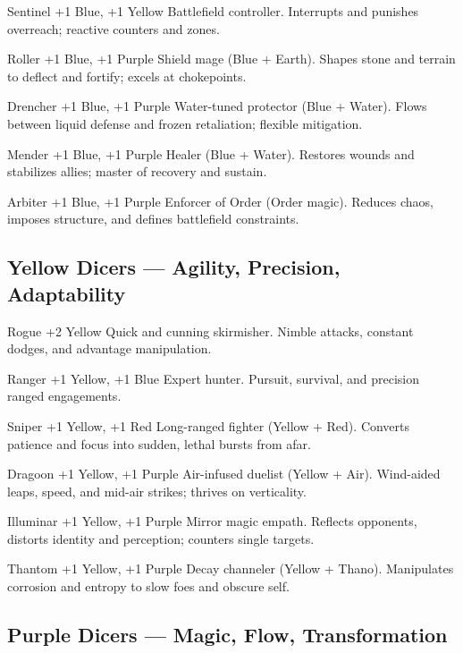 \ClassCard
  {Sentinel}
  {+1 Blue, +1 Yellow}
  {Battlefield controller.}
  {Interrupts and punishes overreach; reactive counters and zones.}

\ClassCard
  {Roller}
  {+1 Blue, +1 Purple}
  {Shield mage (Blue + Earth).}
  {Shapes stone and terrain to deflect and fortify; excels at chokepoints.}

\ClassCard
  {Drencher}
  {+1 Blue, +1 Purple}
  {Water-tuned protector (Blue + Water).}
  {Flows between liquid defense and frozen retaliation; flexible mitigation.}

\ClassCard
  {Mender}
  {+1 Blue, +1 Purple}
  {Healer (Blue + Water).}
  {Restores wounds and stabilizes allies; master of recovery and sustain.}

\ClassCard
  {Arbiter}
  {+1 Blue, +1 Purple}
  {Enforcer of Order (Order magic).}
  {Reduces chaos, imposes structure, and defines battlefield constraints.}

\clearpage

\subsection*{Yellow Dicers — Agility, Precision, Adaptability}

\ClassCard
  {Rogue}
  {+2 Yellow}
  {Quick and cunning skirmisher.}
  {Nimble attacks, constant dodges, and advantage manipulation.}

\ClassCard
  {Ranger}
  {+1 Yellow, +1 Blue}
  {Expert hunter.}
  {Pursuit, survival, and precision ranged engagements.}

\ClassCard
  {Sniper}
  {+1 Yellow, +1 Red}
  {Long-ranged fighter (Yellow + Red).}
  {Converts patience and focus into sudden, lethal bursts from afar.}

\ClassCard
  {Dragoon}
  {+1 Yellow, +1 Purple}
  {Air-infused duelist (Yellow + Air).}
  {Wind-aided leaps, speed, and mid-air strikes; thrives on verticality.}

\ClassCard
  {Illuminar}
  {+1 Yellow, +1 Purple}
  {Mirror magic empath.}
  {Reflects opponents, distorts identity and perception; counters single targets.}

\ClassCard
  {Thantom}
  {+1 Yellow, +1 Purple}
  {Decay channeler (Yellow + Thano).}
  {Manipulates corrosion and entropy to slow foes and obscure self.}

\clearpage

\subsection*{Purple Dicers — Magic, Flow, Transformation}

